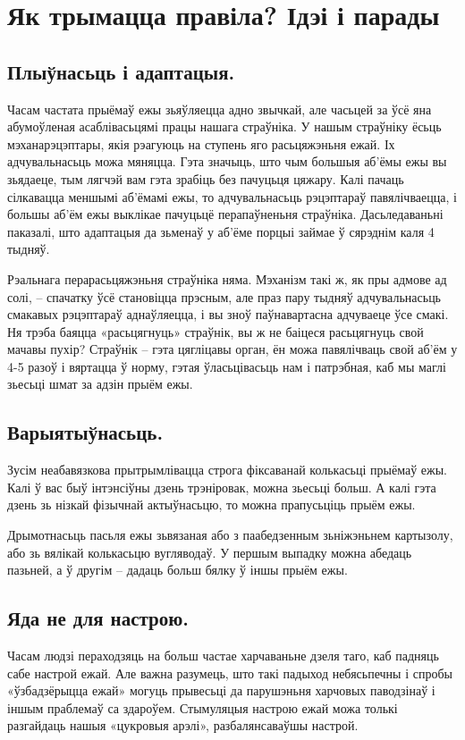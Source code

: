 \section{Як трымацца правіла? Ідэі і парады}

\subsection{Плыўнасьць і адаптацыя.}
Часам частата прыёмаў ежы зьяўляецца адно звычкай, але часьцей за ўсё яна абумоўленая асаблівасьцямі працы нашага страўніка. У нашым страўніку ёсьць мэханарэцэптары, якія рэагуюць на ступень яго расьцяжэньня ежай. Іх адчувальнасьць можа мяняцца. Гэта значыць, што чым большыя аб'ёмы ежы вы зьядаеце, тым лягчэй вам гэта зрабіць без пачуцьця цяжару. Калі пачаць сілкавацца меншымі аб'ёмамі ежы, то адчувальнасьць рэцэптараў павялічваецца, і большы аб'ём ежы выклікае пачуцьцё перапаўненьня страўніка. Дасьледаваньні паказалі, што адаптацыя да зьменаў у аб'ёме порцыі займае ў сярэднім каля 4 тыдняў.

Рэальнага перарасьцяжэньня страўніка няма. Мэханізм такі ж, як пры адмове ад солі, – спачатку ўсё становіцца прэсным, але праз пару тыдняў адчувальнасьць смакавых рэцэптараў аднаўляецца, і вы зноў паўнавартасна адчуваеце ўсе смакі. Ня трэба баяцца «расьцягнуць» страўнік, вы ж не баіцеся расьцягнуць свой мачавы пухір? Страўнік – гэта цягліцавы орган, ён можа павялічваць свой аб'ём у 4-5 разоў і вяртацца ў норму, гэтая ўласьцівасьць нам і патрэбная, каб мы маглі зьесьці шмат за адзін прыём ежы.

\subsection{Варыятыўнасьць.}
Зусім неабавязкова прытрымлівацца строга фіксаванай колькасьці прыёмаў ежы. Калі ў вас быў інтэнсіўны дзень трэніровак, можна зьесьці больш. А калі гэта дзень зь нізкай фізычнай актыўнасьцю, то можна прапусьціць прыём ежы.

Дрымотнасьць пасьля ежы зьвязаная або з паабедзенным зьніжэньнем картызолу, або зь вялікай колькасьцю вугляводаў. У першым выпадку можна абедаць пазьней, а ў другім – дадаць больш бялку ў іншы прыём ежы.

\subsection{Яда не для настрою.}
Часам людзі пераходзяць на больш частае харчаваньне дзеля таго, каб падняць сабе настрой ежай. Але важна разумець, што такі падыход небясьпечны і спробы «ўзбадзёрыцца ежай» могуць прывесьці да парушэньня харчовых паводзінаў і іншым праблемаў са здароўем. Стымуляцыя настрою ежай можа толькі разгайдаць нашыя «цукровыя арэлі», разбалянсаваўшы настрой.

